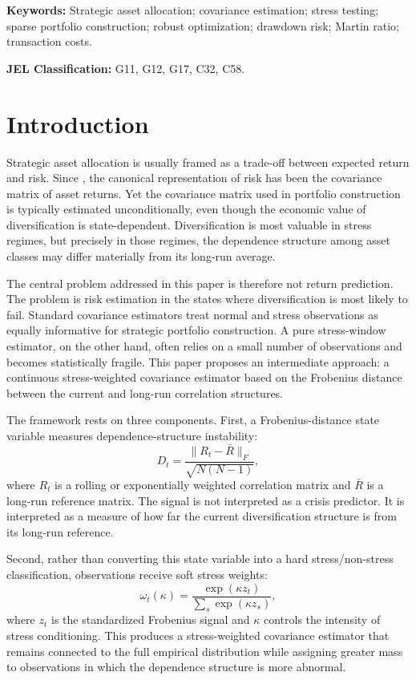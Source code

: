 \documentclass[11pt]{article}
\begin{document}
\vspace{0.5cm}
\noindent \textbf{Keywords:} Strategic asset allocation; covariance estimation; stress testing; sparse portfolio construction; robust optimization; drawdown risk; Martin ratio; transaction costs.

\noindent \textbf{JEL Classification:} G11, G12, G17, C32, C58.

\newpage

\section{Introduction}

Strategic asset allocation is usually framed as a trade-off between expected return and risk. Since \citet{markowitz1952}, the canonical representation of risk has been the covariance matrix of asset returns. Yet the covariance matrix used in portfolio construction is typically estimated unconditionally, even though the economic value of diversification is state-dependent. Diversification is most valuable in stress regimes, but precisely in those regimes, the dependence structure among asset classes may differ materially from its long-run average.

The central problem addressed in this paper is therefore not return prediction. The problem is risk estimation in the states where diversification is most likely to fail. Standard covariance estimators treat normal and stress observations as equally informative for strategic portfolio construction. A pure stress-window estimator, on the other hand, often relies on a small number of observations and becomes statistically fragile. This paper proposes an intermediate approach: a continuous stress-weighted covariance estimator based on the Frobenius distance between the current and long-run correlation structures.

The framework rests on three components. First, a Frobenius-distance state variable measures dependence-structure instability:
\begin{equation}
D_t = \frac{\|R_t - \bar{R}\|_F}{\sqrt{N(N-1)}},
\end{equation}
where $R_t$ is a rolling or exponentially weighted correlation matrix and $\bar{R}$ is a long-run reference matrix. The signal is not interpreted as a crisis predictor. It is interpreted as a measure of how far the current diversification structure is from its long-run reference.

Second, rather than converting this state variable into a hard stress/non-stress classification, observations receive soft stress weights:
\begin{equation}
\omega_t(\kappa) =
\frac{\exp(\kappa z_t)}
{\sum_s \exp(\kappa z_s)},
\end{equation}
where $z_t$ is the standardized Frobenius signal and $\kappa$ controls the intensity of stress conditioning. This produces a stress-weighted covariance estimator that remains connected to the full empirical distribution while assigning greater mass to observations in which the dependence structure is more abnormal.
\end{document}
